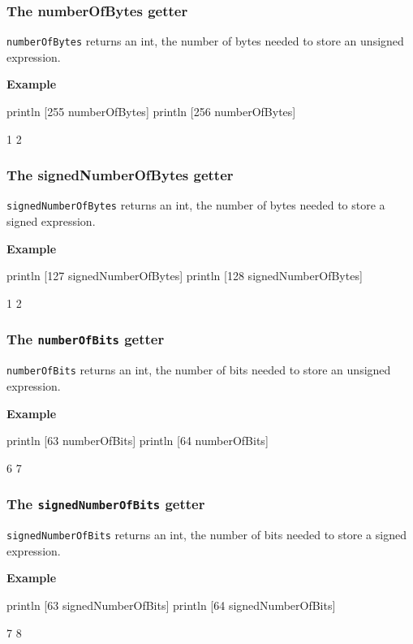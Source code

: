 \documentclass[10pt,openright,twosides,final]{memoir}
\newcommand{\gtlinline}[1]{\colorbox{light-blue}{\lstinline[language=gtl]{#1}}}
\newcommand{\example}{\vspace{.75em}\noindent\textbf{Example}\vspace{0em}}
\begin{document}
\subsubsection{The {\bfseries\ttfamily numberOfBytes} getter}

\gtlinline{numberOfBytes} returns an int, the number of bytes needed to store an unsigned expression.

\example
\begin{gtl}
println [255 numberOfBytes]
println [256 numberOfBytes]
\end{gtl}
\begin{console}
1
2
\end{console}

\subsubsection{The {\bfseries\ttfamily signedNumberOfBytes} getter}

\gtlinline{signedNumberOfBytes} returns an int, the number of bytes needed to store a signed expression. 

\example
\begin{gtl}
println [127 signedNumberOfBytes]
println [128 signedNumberOfBytes]
\end{gtl}
\begin{console}
1
2
\end{console}

\subsubsection{The \texttt{numberOfBits} getter}

\gtlinline{numberOfBits} returns an int, the number of bits needed to store an unsigned expression.

\example
\begin{gtl}
println [63 numberOfBits]
println [64 numberOfBits]
\end{gtl}
\begin{console}
6
7
\end{console}


\subsubsection{The \texttt{signedNumberOfBits} getter}

\gtlinline{signedNumberOfBits} returns an int, the number of bits needed to store a signed expression. 

\example
\begin{gtl}
println [63 signedNumberOfBits]
println [64 signedNumberOfBits]
\end{gtl}
\begin{console}
7
8
\end{console}
\end{document}
